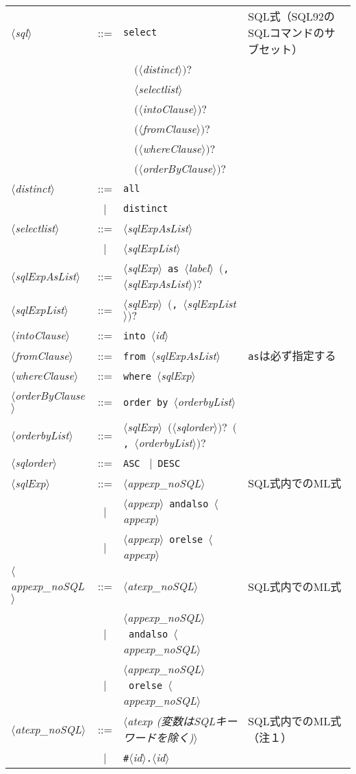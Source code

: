 \documentclass{jbook}
\newcommand{\vbar}{\mbox{\ $|$\ }}
\newcommand{\nonterm}[1]{\mbox{$\langle$}{\it #1}\mbox{$\rangle$}}
\newcommand{\term}[1]{\mbox{{\tt #1}}}
\newcommand{\optional}[1]{\mbox{$($}{\protect #1}\mbox{$)?$}}
\newcommand{\myem}{\mbox{\ \ }}
\begin{document}
\begin{center}
\begin{tabular}{lcll}
\nonterm{sql} &::=& \term{select} &  SQL式（SQL92のSQLコマンドのサブセット）\\
&&	\myem\optional{\nonterm{distinct}}\\
&&	\myem\nonterm{selectlist}\\
&&	\myem\optional{\nonterm{intoClause}}\\
&&	\myem\optional{\nonterm{fromClause}}\\
&&	\myem\optional{\nonterm{whereClause}}\\
&&	\myem\optional{\nonterm{orderByClause}} &\\
\nonterm{distinct} &::=& \term{all} &\\
                  &\vbar& \term{distinct} &\\
\nonterm{selectlist} &::=& \nonterm{sqlExpAsList}\\
                    &\vbar& \nonterm{sqlExpList}\\
\nonterm{sqlExpAsList} &::=& \nonterm{sqlExp}\ \term{as}\ \nonterm{label}\
	\optional{\term{,}\ \nonterm{sqlExpAsList}}\\
\nonterm{sqlExpList} &::=& \nonterm{sqlExp}\ \optional{\term{,}\ \nonterm{sqlExpList}}&\\
\nonterm{intoClause} &::=& \term{into}\ \nonterm{id}  & \\
\nonterm{fromClause} &::=& \term{from}\ \nonterm{sqlExpAsList}  &\term{as}は必ず指定する\\
\nonterm{whereClause} &::=& \term{where}\ \nonterm{sqlExp}\\
\nonterm{orderByClause} &::=& \term{order by}\ \nonterm{orderbyList}\\
\nonterm{orderbyList} &::=& \nonterm{sqlExp}\ \optional{\nonterm{sqlorder}}\ \optional{\term{,}\ \nonterm{orderbyList}}\\
\nonterm{sqlorder} &::=& \term{ASC} \vbar \term{DESC}\\
\nonterm{sqlExp} 
    &::=&   \nonterm{appexp\_noSQL} & SQL式内でのML式\\
    &\vbar& \nonterm{appexp}\ \term{andalso}\ \nonterm{appexp}\\
    &\vbar& \nonterm{appexp}\ \term{orelse}\ \nonterm{appexp}\\
\nonterm{appexp\_noSQL} 
    &::=& \nonterm{atexp\_noSQL} & SQL式内でのML式\\
    &\vbar& \nonterm{appexp\_noSQL}\ \term{andalso}\ \nonterm{appexp\_noSQL}\\
    &\vbar& \nonterm{appexp\_noSQL}\ \term{orelse}\ \nonterm{appexp\_noSQL}\\
\nonterm{atexp\_noSQL} 
    &::=& \nonterm{atexp (変数はSQLキーワードを除く)} & SQL式内でのML式（注１）\\
    &\vbar& \term{\#}\nonterm{id}\term{.}\nonterm{id}
\end{tabular}
\end{center}
\end{document}
